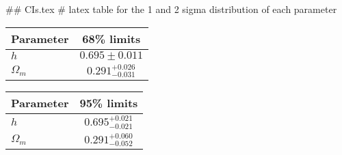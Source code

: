 ## CIs.tex
# latex table for the 1 and 2 sigma distribution of each parameter

\begin{tabular} { l  c}
 Parameter &  68\% limits\\
\hline
{\boldmath$h              $} & $0.695\pm 0.011            $\\
{\boldmath$\Omega_m       $} & $0.291^{+0.026}_{-0.031}   $\\
\hline
\end{tabular}

\begin{tabular} { l  c}
 Parameter &  95\% limits\\
\hline
{\boldmath$h              $} & $0.695^{+0.021}_{-0.021}   $\\
{\boldmath$\Omega_m       $} & $0.291^{+0.060}_{-0.052}   $\\
\hline
\end{tabular}
